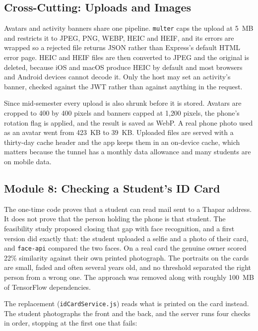 \documentclass{tietreport}
\begin{document}
\subsection{Cross-Cutting: Uploads and Images}

Avatars and activity banners share one pipeline. \texttt{multer} caps the upload at
5~MB and restricts it to JPEG, PNG, WEBP, HEIC and HEIF, and its errors are wrapped so
a rejected file returns JSON rather than Express's default HTML error page. HEIC and
HEIF files are then converted to JPEG and the original is deleted, because iOS and
macOS produce HEIC by default and most browsers and Android devices cannot decode it.
Only the host may set an activity's banner, checked against the JWT rather than against
anything in the request.

Since mid-semester every upload is also shrunk before it is stored. Avatars are cropped
to 400 by 400 pixels and banners capped at 1{,}200 pixels, the phone's rotation flag is
applied, and the result is saved as WebP. A real phone photo used as an avatar went from
423~KB to 39~KB. Uploaded files are served with a thirty-day cache header and the app
keeps them in an on-device cache, which matters because the tunnel has a monthly data
allowance and many students are on mobile data.

\subsection{Module 8: Checking a Student's ID Card}
\label{sec:idcard}

The one-time code proves that a student can read mail sent to a Thapar address. It does
not prove that the person holding the phone is that student. The feasibility study
proposed closing that gap with face recognition, and a first version did exactly that:
the student uploaded a selfie and a photo of their card, and \texttt{face-api} compared
the two faces. On a real card the genuine owner scored 22\% similarity against their own
printed photograph. The portraits on the cards are small, faded and often several years
old, and no threshold separated the right person from a wrong one. The approach was
removed along with roughly 100~MB of TensorFlow dependencies.

The replacement (\texttt{idCardService.js}) reads what is printed on the card instead.
The student photographs the front and the back, and the server runs four checks in order,
stopping at the first one that fails:
\end{document}
